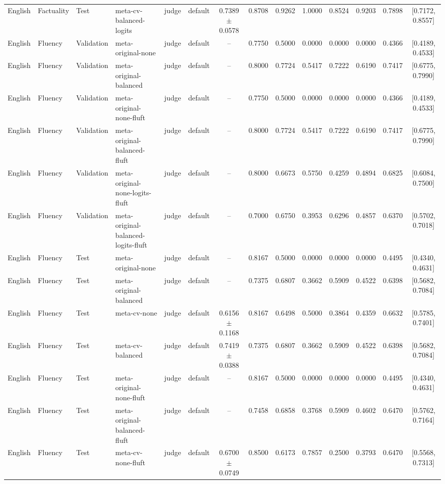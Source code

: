 \begin{tabular}{llllllcccccccc}
English & Factuality & Test & meta-cv-balanced-logits & judge & default & 0.7389 $\pm$ 0.0578 & 0.8708 & 0.9262 & 1.0000 & 0.8524 & 0.9203 & 0.7898 & [0.7172, 0.8557] \\
English & Fluency & Validation & meta-original-none & judge & default & -- & 0.7750 & 0.5000 & 0.0000 & 0.0000 & 0.0000 & 0.4366 & [0.4189, 0.4533] \\
English & Fluency & Validation & meta-original-balanced & judge & default & -- & 0.8000 & 0.7724 & 0.5417 & 0.7222 & 0.6190 & 0.7417 & [0.6775, 0.7990] \\
English & Fluency & Validation & meta-original-none-fluft & judge & default & -- & 0.7750 & 0.5000 & 0.0000 & 0.0000 & 0.0000 & 0.4366 & [0.4189, 0.4533] \\
English & Fluency & Validation & meta-original-balanced-fluft & judge & default & -- & 0.8000 & 0.7724 & 0.5417 & 0.7222 & 0.6190 & 0.7417 & [0.6775, 0.7990] \\
English & Fluency & Validation & meta-original-none-logits-fluft & judge & default & -- & 0.8000 & 0.6673 & 0.5750 & 0.4259 & 0.4894 & 0.6825 & [0.6084, 0.7500] \\
English & Fluency & Validation & meta-original-balanced-logits-fluft & judge & default & -- & 0.7000 & 0.6750 & 0.3953 & 0.6296 & 0.4857 & 0.6370 & [0.5702, 0.7018] \\
English & Fluency & Test & meta-original-none & judge & default & -- & 0.8167 & 0.5000 & 0.0000 & 0.0000 & 0.0000 & 0.4495 & [0.4340, 0.4631] \\
English & Fluency & Test & meta-original-balanced & judge & default & -- & 0.7375 & 0.6807 & 0.3662 & 0.5909 & 0.4522 & 0.6398 & [0.5682, 0.7084] \\
English & Fluency & Test & meta-cv-none & judge & default & 0.6156 $\pm$ 0.1168 & 0.8167 & 0.6498 & 0.5000 & 0.3864 & 0.4359 & 0.6632 & [0.5785, 0.7401] \\
English & Fluency & Test & meta-cv-balanced & judge & default & 0.7419 $\pm$ 0.0388 & 0.7375 & 0.6807 & 0.3662 & 0.5909 & 0.4522 & 0.6398 & [0.5682, 0.7084] \\
English & Fluency & Test & meta-original-none-fluft & judge & default & -- & 0.8167 & 0.5000 & 0.0000 & 0.0000 & 0.0000 & 0.4495 & [0.4340, 0.4631] \\
English & Fluency & Test & meta-original-balanced-fluft & judge & default & -- & 0.7458 & 0.6858 & 0.3768 & 0.5909 & 0.4602 & 0.6470 & [0.5762, 0.7164] \\
English & Fluency & Test & meta-cv-none-fluft & judge & default & 0.6700 $\pm$ 0.0749 & 0.8500 & 0.6173 & 0.7857 & 0.2500 & 0.3793 & 0.6470 & [0.5568, 0.7313] \\

\end{tabular}
